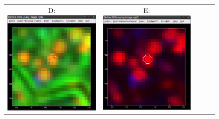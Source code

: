 \documentclass[a4paper, 11pt]{article}
\begin{document}
\begin{figure}[!ht]
\begin{tabular}{ccccc}
\\[5mm]
D: \includegraphics[scale=0.23]{figs3/LANS-roi-interactive3}
&
E: \includegraphics[scale=0.23]{figs3/LANS-roi-interactive4}

\end{tabular}
\end{figure}
\end{document}
